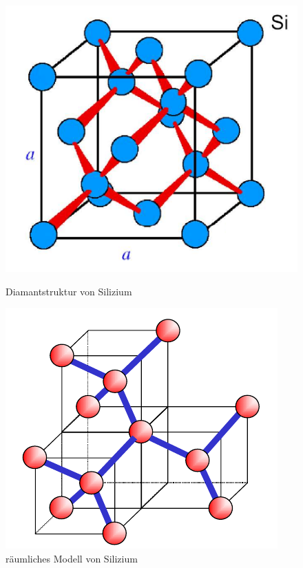 				
	\begin{figure}[h!]
		\centering
		\begin{minipage}[t]{0.35\linewidth}
			\centering
			\includegraphics[width=\linewidth]{Kapitel/Kap02/Diamantstruktur_SI.PNG}
			\caption{Diamantstruktur von Silizium}
			\label{02_diamStruktur}
		\end{minipage}%
		\hfill
		\begin{minipage}[t]{0.35\linewidth}
			\centering
			\includegraphics[width=\linewidth]{Kapitel/Kap02/raeumlichesModell_SI.PNG}
			\caption{räumliches Modell von Silizium}
			\label{02_raeumlModell}
		\end{minipage}
	\end{figure}

